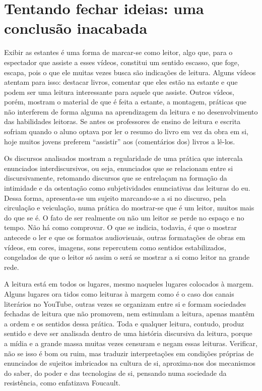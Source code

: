 \section{Tentando fechar ideias: uma conclusão inacabada}\label{sec-tentandofecharideias}

Exibir as estantes é uma forma de marcar-se como leitor, algo que, para o espectador que assiste a esses vídeos, constitui um sentido escasso, que foge, escapa, pois o que ele muitas vezes busca são indicações de leitura. Alguns vídeos atentam para isso: destacar livros, comentar que eles estão na estante e que podem ser uma leitura interessante para aquele que assiste. Outros vídeos, porém, mostram o material de que é feita a estante, a montagem, práticas que não interferem de forma alguma na aprendizagem da leitura e no desenvolvimento das habilidades leitoras. Se antes os professores de ensino de leitura e escrita sofriam quando o aluno optava por ler o resumo do livro em vez da obra em si, hoje muitos jovens preferem “assistir” aos (comentários dos) livros a lê-los.

Os discursos analisados mostram a regularidade de uma prática que intercala enunciados interdiscursivos, ou seja, enunciados que se relacionam entre si discursivamente, retomando discursos que se entrelaçam na formação da intimidade e da ostentação como subjetividades enunciativas das leituras do eu. Dessa forma, apresenta-se um sujeito marcando-se a si no discurso, pela circulação e veiculação, numa prática do mostrar-se que é um leitor, muitos mais do que se é. O fato de ser realmente ou não um leitor se perde no espaço e no tempo. Não há como comprovar. O que se indicia, todavia, é que o mostrar antecede o ler e que os formatos audiovisuais, outras formatações de obras em vídeos, em cores, imagens, sons repercutem como sentidos estabilizados, congelados de que o leitor só assim o será se mostrar a si como leitor na grande rede. 

A leitura está em todos os lugares, mesmo naqueles lugares colocados à margem. Alguns lugares ora tidos como leituras à margem como é o caso dos canais literários no YouTube, outras vezes se organizam entre si e formam sociedades fechadas de leitura que não promovem, nem estimulam a leitura, apenas mantêm a ordem e os sentidos dessa prática. Toda e qualquer leitura, contudo, produz sentido e deve ser analisada dentro de uma história discursiva da leitura, porque a mídia e a grande massa muitas vezes censuram e negam essas leituras. Verificar, não se isso é bom ou ruim, mas traduzir interpretações em condições próprias de enunciados de sujeitos imbricados na cultura de si, aproxima-nos dos mecanismos do saber, do poder e das tecnologias de si, pensando numa sociedade da resistência, como enfatizava Foucault.